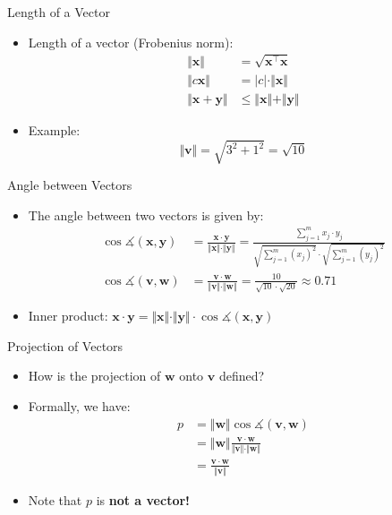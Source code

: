 \begin{frame}{Length of a Vector}{}
	\begin{itemize}
		\item Length of a vector (Frobenius norm):
		\begin{align}
			\Vert \bm{x} \Vert
				&= \sqrt{\bm{x}^{\intercal} \bm{x}}		\\[1mm]
			\Vert c \bm{x} \Vert
				&= \vert c \vert \cdot \Vert \bm{x} \Vert	\\[1mm]
			\Vert \bm{x} + \bm{y} \Vert
				&\le \Vert \bm{x} \Vert + \Vert \bm{y} \Vert
		\end{align}
		\item Example:
		\begin{equation*}
			\Vert \bm{v} \Vert = \sqrt{3^2 + 1^2} = \sqrt{10}
		\end{equation*}
	\end{itemize}
\end{frame}


\begin{frame}{Angle between Vectors}{}
	\begin{itemize}
		\item The angle between two vectors is given by:
		\begin{align}
			\cos \measuredangle (\bm{x}, \bm{y}) &= \frac{\bm{x} \cdot \bm{y}}{\Vert \bm{x} \Vert \cdot \Vert \bm{y} \Vert}
				= \frac{\sum_{j=1}^m x_j \cdot y_j}{\sqrt{\sum_{j=1}^m (x_j)^2} \cdot \sqrt{\sum_{j=1}^m (y_j)^2}} \\[3mm]
			\nonumber
			\cos \measuredangle (\bm{v}, \bm{w}) &= \frac{\bm{v} \cdot \bm{w}}{\Vert \bm{v} \Vert \cdot \Vert \bm{w} \Vert}
				= \frac{10}{\sqrt{10} \cdot \sqrt{20}} \approx 0.71
		\end{align}
		\vspace*{1mm}
		\item Inner product: $\bm{x} \cdot \bm{y}
			= \Vert \bm{x} \Vert \cdot \Vert \bm{y} \Vert \cdot \cos \measuredangle (\bm{x}, \bm{y})$
	\end{itemize}
\end{frame}


\begin{frame}{Projection of Vectors}{}
	\begin{itemize}
		\item How is the projection of $\bm{w}$ onto $\bm{v}$ defined?
		\item Formally, we have:
		\begin{align}
			\nonumber
			p 	&= \Vert \bm{w} \Vert \cos \measuredangle (\bm{v}, \bm{w}) 							\\[1mm]
			\nonumber
				&= \Vert \bm{w} \Vert \frac{\bm{v} \cdot \bm{w}}{\Vert \bm{v} \Vert \cdot \Vert \bm{w} \Vert} 	\\[1mm]
				&= \frac{\bm{v} \cdot \bm{w}}{\Vert \bm{v} \Vert}
		\end{align}
		\item Note that $p$ is \textbf{not a vector!}
	\end{itemize}
\end{frame}


